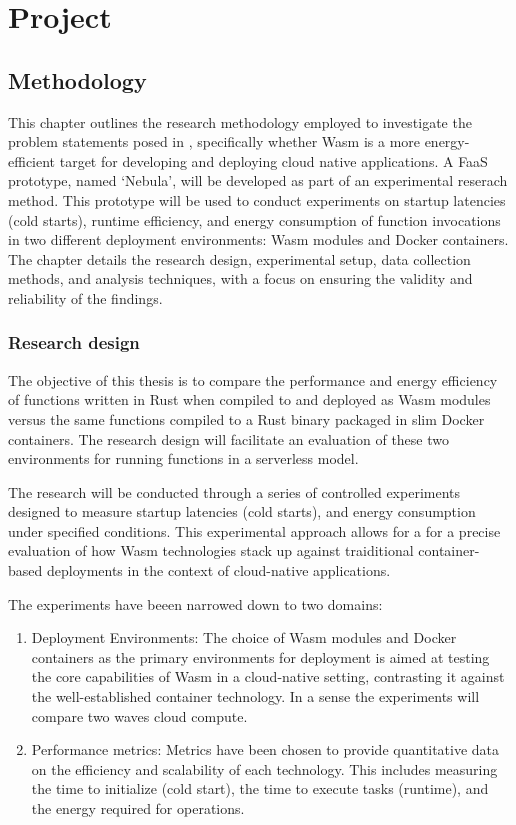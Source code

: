 \documentclass[
  table]{report}
\begin{document}
\part{Project}

\chapter{Methodology}

This chapter outlines the research methodology employed to investigate
the problem statements posed in , specifically
whether \ac{Wasm} is a more energy-efficient target for developing and
deploying cloud native applications. A \ac{FaaS} prototype, named
`Nebula', will be developed as part of an experimental reserach method.
This prototype will be used to conduct experiments on startup latencies
(cold starts), runtime efficiency, and energy consumption of function
invocations in two different deployment environments: \ac{Wasm} modules
and Docker containers. The chapter details the research design,
experimental setup, data collection methods, and analysis techniques,
with a focus on ensuring the validity and reliability of the findings.

\section{Research design}

The objective of this thesis is to compare the performance and energy
efficiency of functions written in Rust when compiled to and deployed as
\ac{Wasm} modules versus the same functions compiled to a Rust binary
packaged in slim Docker containers. The research design will facilitate
an evaluation of these two environments for running functions in a
serverless model.

The research will be conducted through a series of controlled
experiments designed to measure startup latencies (cold starts), and
energy consumption under specified conditions. This experimental
approach allows for a for a precise evaluation of how \ac{Wasm}
technologies stack up against traiditional container-based deployments
in the context of cloud-native applications.

The experiments have beeen narrowed down to two domains:

\begin{enumerate}
\def\labelenumi{\arabic{enumi}.}
\item
  Deployment Environments: The choice of \ac{Wasm} modules and Docker
  containers as the primary environments for deployment is aimed at
  testing the core capabilities of \ac{Wasm} in a cloud-native setting,
  contrasting it against the well-established container technology. In a
  sense the experiments will compare two waves cloud compute.
\item
  Performance metrics: Metrics have been chosen to provide quantitative
  data on the efficiency and scalability of each technology. This
  includes measuring the time to initialize (cold start), the time to
  execute tasks (runtime), and the energy required for operations.
\end{enumerate}
\end{document}
